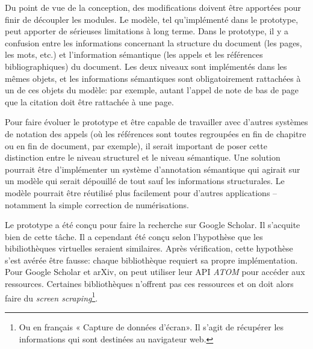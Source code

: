 Du point de vue de la conception, des modifications doivent être apportées pour finir de découpler les modules. Le modèle, tel qu'implémenté dans le prototype, peut apporter de sérieuses limitations à long terme. Dans le prototype, il y a confusion entre les informations concernant la structure du document (les pages, les mots, etc.) et l'information sémantique (les appels et les références bibliographiques) du document. Les deux niveaux sont implémentés dans les mêmes objets, et les informations sémantiques sont obligatoirement rattachées à un de ces objets du modèle: par exemple, autant l'appel de note de bas de page que la citation doit être rattachée à une page.

Pour faire évoluer le prototype et être capable de travailler avec d'autres systèmes de notation des appels (où les références sont toutes regroupées en fin de chapitre ou en fin de document, par exemple), il serait important de poser cette distinction entre le niveau structurel et le niveau sémantique. Une solution pourrait être d'implémenter un système d'annotation sémantique qui agirait sur un modèle qui serait dépouillé de tout sauf les informations structurales. Le modèle pourrait être réutilisé plus facilement pour d'autres applications -- notamment la simple correction de numérisations.

Le prototype a été conçu pour faire la recherche sur Google Scholar. Il s'acquite bien de cette tâche. Il a cependant été conçu selon l'hypothèse que les bibiliothèques virtuelles seraient similaires. Après vérification, cette hypothèse s'est avérée être fausse: chaque bibliothèque requiert sa propre implémentation. Pour Google Scholar et arXiv, on peut utiliser leur API \emph{ATOM} pour accéder aux ressources. Certaines bibliothèques n'offrent pas ces ressources et on doit alors faire du \emph{screen scraping}\footnote{Ou en français « Capture de données d'écran». Il s'agit de récupérer les informations qui sont destinées au navigateur web.}.
